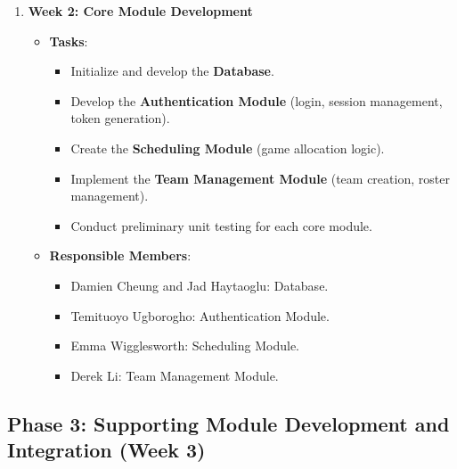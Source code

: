 \documentclass[12pt, titlepage]{article}
\begin{document}
\begin{enumerate}
    \item \textbf{Week 2: Core Module Development}
    \begin{itemize}
        \item \textbf{Tasks}:
        \begin{itemize}
			\item Initialize and develop the \textbf{Database}.
            \item Develop the \textbf{Authentication Module} (login, session management, token generation).
            \item Create the \textbf{Scheduling Module} (game allocation logic).
            \item Implement the \textbf{Team Management Module} (team creation, roster management).
            \item Conduct preliminary unit testing for each core module.
        \end{itemize}
        \item \textbf{Responsible Members}:
        \begin{itemize}
			\item Damien Cheung and Jad Haytaoglu: Database.
            \item Temituoyo Ugborogho: Authentication Module.
            \item Emma Wigglesworth: Scheduling Module.
            \item Derek Li: Team Management Module.
        \end{itemize}
    \end{itemize}
\end{enumerate}

\subsection*{Phase 3: Supporting Module Development and Integration (Week 3)}
\end{document}
